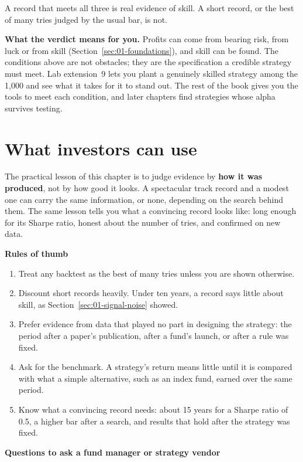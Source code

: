 A record that meets all three is real evidence of skill. A short record, or the best of many tries judged by the usual bar, is not.

\textbf{What the verdict means for you.} Profits can come from bearing risk, from luck or from skill (Section~\ref{sec:01-foundations}), and skill can be found. The conditions above are not obstacles; they are the specification a credible strategy must meet. Lab extension~9 lets you plant a genuinely skilled strategy among the 1,000 and see what it takes for it to stand out. The rest of the book gives you the tools to meet each condition, and later chapters find strategies whose alpha survives testing.

\section{What investors can use}
\label{sec:01-investors}

The practical lesson of this chapter is to judge evidence by \textbf{how it was produced}, not by how good it looks. A spectacular track record and a modest one can carry the same information, or none, depending on the search behind them. The same lesson tells you what a convincing record looks like: long enough for its Sharpe ratio, honest about the number of tries, and confirmed on new data.

\textbf{Rules of thumb}

\begin{enumerate}
  \item Treat any backtest as the best of many tries unless you are shown otherwise.
  \item Discount short records heavily. Under ten years, a record says little about skill, as Section~\ref{sec:01-signal-noise} showed.
  \item Prefer evidence from data that played no part in designing the strategy: the period after a paper's publication, after a fund's launch, or after a rule was fixed.
  \item Ask for the benchmark. A strategy's return means little until it is compared with what a simple alternative, such as an index fund, earned over the same period.
  \item Know what a convincing record needs: about 15 years for a Sharpe ratio of 0.5, a higher bar after a search, and results that hold after the strategy was fixed.
\end{enumerate}

\textbf{Questions to ask a fund manager or strategy vendor}

